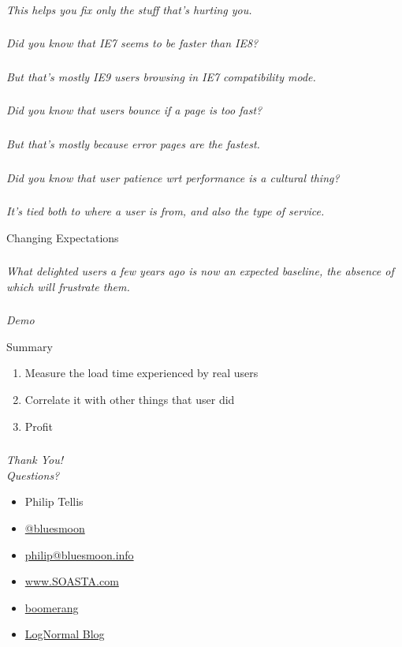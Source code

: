 \documentclass{beamer}
\newcommand{\innersplash}[1]{
  \begin{center}
    \Large \textrm{\textit{ #1 } }
  \end{center}
}
\newcommand{\splashslide}[2][{}]{
  \begin{frame}
  \frametitle{#1}
  \innersplash{#2}
  \end{frame}
}
\begin{document}
\splashslide{This helps you fix only the stuff that's hurting you.}

\splashslide{Did you know that IE7 seems to be faster than IE8?}
\splashslide{But that's mostly IE9 users browsing in IE7 compatibility mode.}

\splashslide{Did you know that users bounce if a page is too fast?}
\splashslide{But that's mostly because error pages are the fastest.}

\splashslide{Did you know that user patience wrt performance is a cultural thing?}
\splashslide{It's tied both to where a user is from, and also the type of service.}

\begin{frame}{Changing Expectations}
\end{frame}

\splashslide{What delighted users a few years ago is now an expected baseline, the absence of which will frustrate them.}

\splashslide{Demo}

\begin{frame}{Summary}
  \begin{enumerate}
  \item<1-> Measure the load time experienced by real users
  \item<2-> Correlate it with other things that user did
  \item<3-> Profit
  \end{enumerate}
\end{frame}

\splashslide{Thank You! \\ Questions?}

\begin{frame}
  \begin{itemize}
  \item Philip Tellis
  \item \href{http://twitter.com/bluesmoon}{@bluesmoon}
  \item \href{http://bluesmoon.info/}{philip@bluesmoon.info}
  \item \href{http://www.soasta.com/}{www.SOASTA.com}
  \item \href{http://lognormal.github.com/boomerang/doc/}{boomerang}
  \item \href{http://www.lognormal.com/blog/}{LogNormal Blog}
  \end{itemize}
\end{frame}
\end{document}
